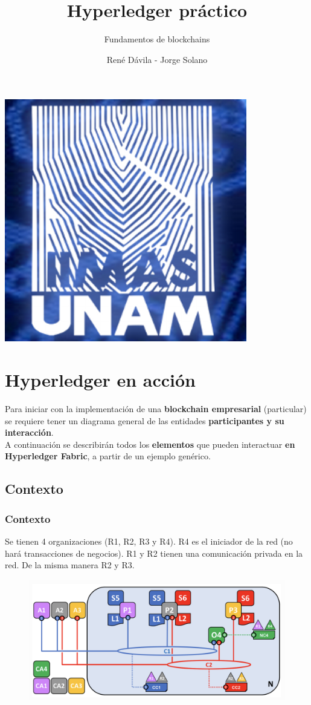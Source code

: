 \documentclass{beamer}
\title[]{Hyperledger práctico}
\subtitle{Fundamentos de blockchains}
\author{René Dávila - Jorge Solano}
\date{ }
\begin{document}
	\EnableBpAbbreviations
	\begin{frame}
		\begin{center}
			\includegraphics [width =0.2 \textwidth ]{iimas}
		\end{center}
		\titlepage 
	\end{frame}
	
	\section{Hyperledger en acción}
	
	\begin{frame}
		Para iniciar con la implementación de una \textbf{blockchain empresarial} (particular) se requiere tener un diagrama general de las entidades \textbf{participantes y su interacción}.\\
		\vspace{4mm}
		A continuación se describirán todos los \textbf{elementos} que pueden interactuar \textbf{en Hyperledger Fabric}, a partir de un ejemplo genérico.
	\end{frame}
	
	\subsection{Contexto}
	
	\begin{frame}
		\frametitle{Contexto}
		Se tienen 4 organizaciones (R1, R2, R3 y R4). R4 es el iniciador de la red (no hará transacciones de negocios). R1 y R2 tienen una comunicación privada en la red. De la misma manera R2 y R3.
		\begin{figure}[h]
			\includegraphics[scale=.3]{start_01}
			\centering
		\end{figure}
	\end{frame}
	
\end{document}
